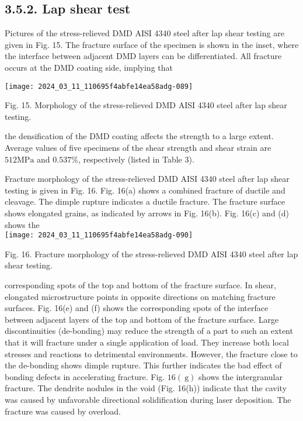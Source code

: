 \documentclass[10pt]{article}
\begin{document}
\subsection*{3.5.2. Lap shear test}
Pictures of the stress-relieved DMD AISI 4340 steel after lap shear testing are given in Fig. 15. The fracture surface of the specimen is shown in the inset, where the interface between adjacent DMD layers can be differentiated. All fracture occurs at the DMD coating side, implying that

\begin{center}
\texttt{[image: 2024\_03\_11\_110695f4abfe14ea58adg-089]}
\end{center}

Fig. 15. Morphology of the stress-relieved DMD AISI 4340 steel after lap shear testing.

the densification of the DMD coating affects the strength to a large extent. Average values of five specimens of the shear strength and shear strain are $512 \mathrm{MPa}$ and $0.537 \%$, respectively (listed in Table 3).

Fracture morphology of the stress-relieved DMD AISI 4340 steel after lap shear testing is given in Fig. 16. Fig. 16(a) shows a combined fracture of ductile and cleavage. The dimple rupture indicates a ductile fracture. The fracture surface shows elongated grains, as indicated by arrows in Fig. 16(b). Fig. 16(c) and (d) shows the\\
\texttt{[image: 2024\_03\_11\_110695f4abfe14ea58adg-090]}

Fig. 16. Fracture morphology of the stress-relieved DMD AISI 4340 steel after lap shear testing.

corresponding spots of the top and bottom of the fracture surface. In shear, elongated microstructure points in opposite directions on matching fracture surfaces. Fig. 16(e) and (f) shows the corresponding spots of the interface between adjacent layers of the top and bottom of the fracture surface. Large discontinuities (de-bonding) may reduce the strength of a part to such an extent that it will fracture under a single application of load. They increase both local stresses and reactions to detrimental environments. However, the fracture close to the de-bonding shows dimple rupture. This further indicates the bad effect of bonding defects in accelerating fracture. Fig. $16(\mathrm{~g})$ shows the intergranular fracture. The dendrite nodules in the void (Fig. 16(h)) indicate that the cavity was caused by unfavorable directional solidification during laser deposition. The fracture was caused by overload.
\end{document}
